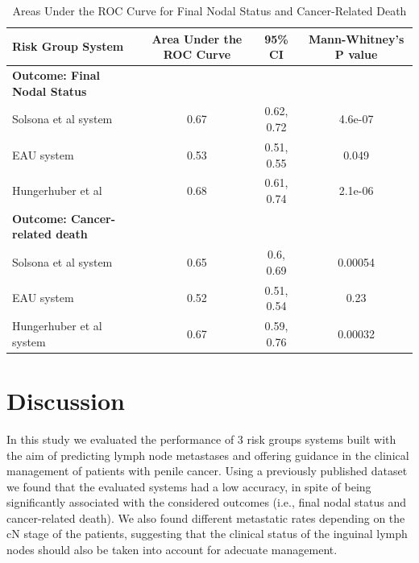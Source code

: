 \documentclass[11pt,letterpaper]{article}\usepackage[]{graphicx}\usepackage[]{color}
\begin{document}
\begin{multicols}{2}
\begin{table}[t]
\centering
        \caption{Areas Under the ROC Curve for Final Nodal Status and Cancer-Related Death}
        \label{tab:ROC}
\begin{tabular}{lccc}
\hline
Risk Group System & Area Under the ROC Curve & 95\% CI & Mann-Whitney's P value \\
\hline
\textbf{Outcome: Final Nodal Status} & ~ & ~ & ~ \\
        \hspace{2ex}Solsona et al system 
                & 0.67
                & 0.62, 0.72
                & 4.6e-07 \\
        \hspace{2ex}EAU system
                & 0.53
                & 0.51, 0.55
                & 0.049 \\
        \hspace{2ex}Hungerhuber et al
                & 0.68
                & 0.61, 0.74
                & 2.1e-06 \\
\textbf{Outcome: Cancer-related death} & ~ & ~ & ~ \\
        \hspace{2ex}Solsona et al system
                & 0.65
                & 0.6, 0.69
                & 0.00054 \\
        \hspace{2ex}EAU system
                & 0.52
                & 0.51, 0.54
                & 0.23 \\
        \hspace{2ex}Hungerhuber et al system
                & 0.67
                & 0.59, 0.76
                & 0.00032 \\
\hline
\end{tabular}
\end{table}

\section*{Discussion}
In this study we evaluated the performance of 3 risk groups systems built with the aim of predicting lymph node metastases and offering guidance in the clinical management of patients with penile cancer. Using a previously published dataset we found that the evaluated systems had a low accuracy, in spite of being significantly associated with the considered outcomes (i.e., final nodal status and cancer-related death). We also found different metastatic rates depending on the cN stage of the patients, suggesting that the clinical status of the inguinal lymph nodes should also be taken into account for adecuate management.


\end{multicols}
\end{document}
